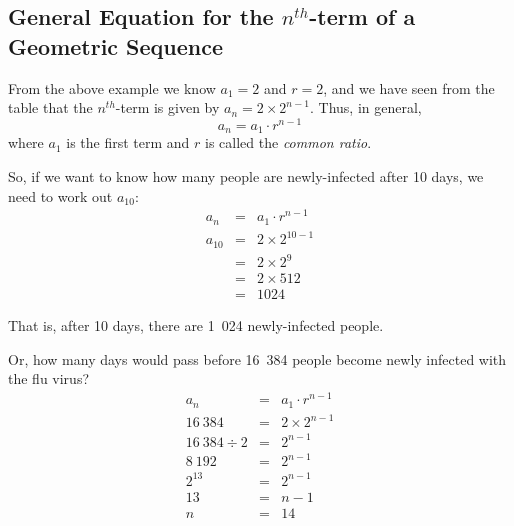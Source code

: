 
\subsection{General Equation for the $n^{th}$-term of a Geometric Sequence}

From the above example we know $a_1 = 2$ and $r = 2$, and we have seen from the table that the
$n^{th}$-term is given by $a_n = 2 \times 2^{n-1}$. Thus, in general,
\begin{equation}
a_n = a_1 \cdot r^{n-1}
\end{equation}
where $a_1$ is the first term and $r$ is called the \textit{common ratio}. 

So, if we want to know how many people are newly-infected after 10 days, we need to work
out $a_{10}$:
\begin{eqnarray*}
a_n &=& a_1 \cdot r^{n-1} \\
a_{10} &=& 2 \times 2^{10-1} \\
&=& 2 \times 2^9 \\
&=& 2 \times 512 \\
&=& 1024
\end{eqnarray*}

That is, after 10 days, there are 1~024 newly-infected people.

Or, how many days would pass before 16~384 people become newly infected with the flu virus?
\begin{eqnarray*}
a_n &=& a_1 \cdot r^{n-1} \\
16~384 &=& 2 \times 2^{n-1} \\
16~384 \div 2 &=& 2^{n-1} \\
8~192 &=& 2^{n-1} \\
2^{13} &=& 2^{n-1} \\
13 &=& n - 1 \\
n &=& 14
\end{eqnarray*}

